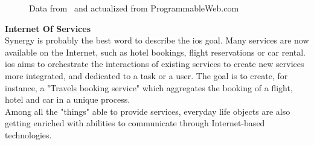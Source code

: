 \begin{figure}
\begin{center}
\hspace{3mm}
\end{center}
\caption{Data from~\cite{Domingue:2009} and actualized from ProgrammableWeb.com}
\label{fig:apis}
\end{figure}


{\bf Internet Of Services}\\
\label{subsec:ios}
Synergy is probably the best word to describe the \gls{ios} goal. Many services are now available on the Internet, such as hotel bookings, flight reservations or car rental. \gls{ios} aims to orchestrate the interactions of existing services to create new services more integrated, and dedicated to a task or a user. The goal is to create, for instance, a "Travels booking service" which aggregates the booking of a flight, hotel and car in a unique process.\\

Among all the "things" able to provide services, everyday life objects are also getting enriched with abilities to communicate through Internet-based technologies.\\

